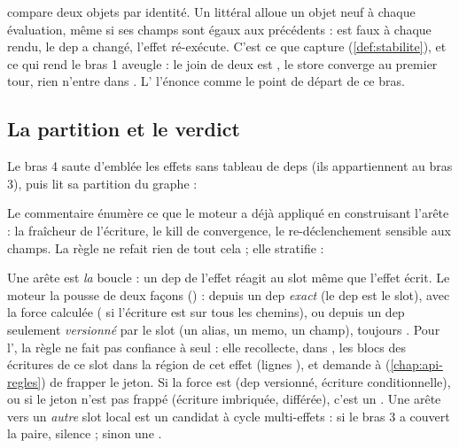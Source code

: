 \begin{react}
 compare deux objets par identité. Un littéral  alloue un objet neuf à chaque évaluation, même si ses champs sont égaux aux précédents :  est faux à chaque rendu, le dep a changé, l'effet ré-exécute. C'est ce que capture  (\cref{def:stabilite}), et ce qui rend le bras 1 aveugle : le join de deux  est , le store converge au premier tour, rien n'entre dans . L' l'énonce comme le point de départ de ce bras.
\end{react}

\subsection{La partition et le verdict}

Le bras 4 saute d'emblée les effets sans tableau de deps (ils appartiennent au bras 3), puis lit sa partition du graphe :


Le commentaire énumère ce que le moteur a déjà appliqué en construisant l'arête : la fraîcheur de l'écriture, le kill de convergence, le re-déclenchement sensible aux champs. La règle ne refait rien de tout cela ; elle stratifie :


Une arête  est \emph{la} boucle : un dep de l'effet réagit au slot même que l'effet écrit. Le moteur la pousse de deux façons () : depuis un dep \emph{exact} (le dep est le slot), avec la force calculée ( si l'écriture est  sur tous les chemins), ou depuis un dep seulement \emph{versionné} par le slot (un alias, un memo, un champ), toujours . Pour l'\Error, la règle ne fait pas confiance à  seul : elle recollecte, dans , les blocs des écritures  de ce slot dans la région de cet effet (lignes ), et demande à  (\cref{chap:api-regles}) de frapper le jeton. Si la force est  (dep versionné, écriture conditionnelle), ou si le jeton n'est pas frappé (écriture imbriquée, différée), c'est un \Warning. Une arête vers un \emph{autre} slot local est un candidat à cycle multi-effets : si le bras 3 a couvert la paire, silence ; sinon une \Info.

